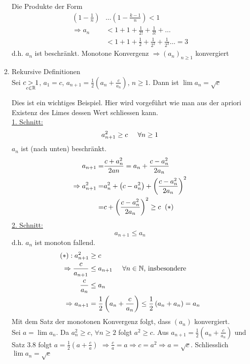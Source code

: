 \begin{enumerate}
\begin{beweis}{}
\noindent Die Produkte der Form
\begin{align*}
\left( {1 - \frac{1}{n}} \right) &\ldots \left( {1 - \frac{{k - 1}}{n}} \right) < 1\\
 \Rightarrow {a_n} &< 1 + 1 + \frac{1}{{2!}} + \frac{1}{{3!}} +  \ldots \\
&< 1 + 1 + \frac{1}{2} + \frac{1}{{{2^2}}} + \frac{1}{{{2^3}}} \ldots  = 3
\end{align*}
d.h. $a_n$ ist beschränkt. Monotone Konvergenz $\Rightarrow \left( a_n\right)_{n\geq 1}$ konvergiert
\end{beweis}
\item Rekursive Definitionen\\
Sei $\mathop {c > 1}\limits_{c \in\mathbb{R} }$, $a_1=c$, ${a_{n + 1}} = \frac{1}{2}\left( {{a_n} + \frac{c}{{{a_n}}}} \right)$, $n\geq 1$. Dann ist $\lim a_n=\sqrt{c}$
\begin{beweis}{}
Dies ist ein wichtiges Beispiel. Hier wird vorgeführt wie man aus der apriori Existenz des Limes dessen Wert schliessen kann.\\

\noindent\underline{1. Schnitt:}
\[a_{n + 1}^2 \ge c\hspace{5mm}\forall n\geq 1\]
$a_n$ ist (nach unten) beschränkt.
\begin{align*}
{a_{n + 1}} =&\frac{{c + a_n^2}}{{2an}} = {a_n} + \frac{{c - a_n^2}}{{2{a_n}}}\\
 \Rightarrow a_{n + 1}^2 =&a_n^2 + \left( {c - a_n^2} \right) + {\left( {\frac{{c - a_n^2}}{{2{a_n}}}} \right)^2}\\
 =&c + {\left( {\frac{{c - a_n^2}}{{2{a_n}}}} \right)^2} \ge c\hspace{2mm}\text{(\textasteriskcentered)}
\end{align*}
\noindent\underline{2. Schnitt:}
\[a_{n+1}\leq a_n\]
d.h. $a_n$ ist monoton fallend.
\begin{align*}
\text{(\textasteriskcentered)}: a_{n+1}^2&\geq c\\
\Rightarrow\frac{c}{a_{n+1}}&\leq a_{n+1}\hspace{5mm} \forall n\in\N\text{, insbesondere}\\
\frac{c}{a_n}&\leq a_n \\
\Rightarrow a_{n+1}&=\frac{1}{2}\left( {{a_n} + \frac{c}{{{a_n}}}} \right) \le \frac{1}{2}\left( {{a_n} + {a_n}} \right) = {a_n}
\end{align*}
Mit dem Satz der monotonen Konvergenz folgt, dass $\left( a_n\right)$ konvergiert.\\

\noindent Sei $a=\lim a_n$. Da $a_n^2\geq c$, $\forall n\geq 2$ folgt $a^2\geq c$. Aus $a_{n+1}=\frac{1}{2}\left( a_n+\frac{c}{a_n}\right)$ und Satz 3.8 folgt $a=\frac{1}{2}\left( a+\frac{c}{a}\right)$ $\Rightarrow\frac{c}{a}=a\Rightarrow c=a^2\Rightarrow a=\sqrt{c}$. Schliesslich $\lim a_n=\sqrt{c}$
\end{beweis}
\end{enumerate}


